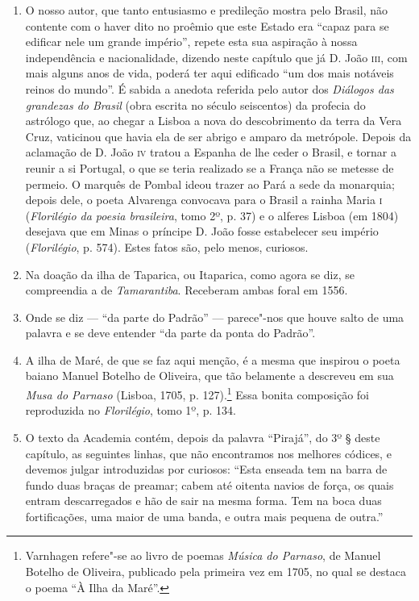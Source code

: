 \begin{enumerate}
\item O nosso autor, que tanto entusiasmo e predileção mostra pelo Brasil, não contente 
com o haver dito no proêmio que este Estado era ``capaz para se edificar nele um 
grande império'', repete esta sua aspiração à nossa independência e nacionalidade, 
dizendo neste capítulo que já D. João \textsc{iii}, com mais alguns anos de vida, poderá ter aqui 
edificado ``um dos mais notáveis reinos do mundo''. 
É sabida a anedota referida pelo autor dos \textit{Diálogos das grandezas do Brasil} (obra 
escrita no século seiscentos) da profecia do astrólogo que, ao chegar a Lisboa a nova do 
descobrimento da terra da Vera Cruz, vaticinou que havia ela de 
ser abrigo e amparo da metrópole. Depois da aclamação de D. João \textsc{iv} tratou a Espanha de 
lhe ceder o Brasil, e tornar a reunir a si Portugal, o que se teria realizado se a França não se 
metesse de permeio. O marquês de Pombal ideou trazer ao Pará a sede da monarquia; depois 
dele, o poeta Alvarenga convocava para o Brasil a rainha Maria \textsc{i} (\textit{Florilégio da poesia brasileira}, 
tomo 2º, p. 37) e o alferes Lisboa (em 1804) desejava que em Minas o príncipe 
D. João fosse estabelecer seu império (\textit{Florilégio}, p. 574). Estes fatos são, pelo menos, 
curiosos.

\item Na doação da ilha de Taparica, ou Itaparica, como agora se diz, se compreendia a 
de \textit{Tamarantiba}. Receberam ambas foral em 1556.

\item Onde se diz --- ``da parte do Padrão'' --- parece"-nos que houve salto de uma palavra e 
se deve entender ``da parte da ponta do Padrão''. 

\item A ilha de Maré, de que se faz aqui menção, é a mesma que inspirou o poeta baiano 
Manuel Botelho de Oliveira, que tão belamente a descreveu em sua \textit{Musa do Parnaso} 
(Lisboa, 1705, p. 127).\footnote{ Varnhagen refere"-se ao livro de poemas \textit{Música do Parnaso}, de Manuel Botelho de Oliveira, 
publicado pela primeira vez em 1705, no qual se destaca o poema ``À Ilha da Maré''.} 
Essa bonita composição foi reproduzida  no  \textit{Florilégio}, tomo 1º, p. 134.

\item O texto da Academia contém, depois da palavra ``Pirajá'', do 3º § deste capítulo, as 
seguintes linhas, que não encontramos nos melhores códices, e devemos julgar 
introduzidas por curiosos: ``Esta enseada tem na barra de fundo duas braças de preamar; 
cabem até oitenta navios de força, os quais entram descarregados e hão de sair na mesma 
forma. Tem na boca duas fortificações, uma maior de uma banda, e outra mais 
pequena de outra.''


\end{enumerate}
